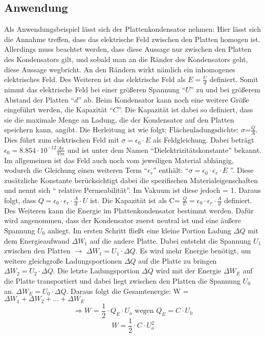 \subsection{Anwendung}
\label{sec:Plattenkondensator}
Als Anwendungsbeispiel lässt sich der Plattenkondensator nehmen:
Hier lässt sich die Annahme treffen, dass das elektrische Feld zwischen den Platten homogen ist.
Allerdings muss beachtet werden, dass diese Aussage nur zwischen den Platten des Kondensators gilt, und sobald man an die Ränder des Kondensators geht, diese Aussage wegbricht.
An den Rändern wirkt nämlich ein inhomogenes elektrisches Feld.
Des Weiteren ist das elektrische Feld als $E = \frac{U}{d}$ definiert.
Somit nimmt das elektrische Feld bei einer größeren Spannung "`$U$"' zu und bei größerem Abstand der Platten "`$d$"' ab.
Beim Kondensator kann noch eine weitere Größe eingeführt werden, die Kapazität "`$C$"'.
Die Kapazität ist dabei so definiert, dass sie die maximale Menge an Ladung, die der Kondensator auf den Platten speichern kann, angibt.
Die Herleitung ist wie folgt:
$\mbox{Flächenladungsdichte: } \sigma \mbox{=} \frac{Q}{A}$.
Dies führt zum elektrischen Feld mit $\sigma = \epsilon_0 \cdot E$ als Feldgleichung.
Dabei beträgt $\epsilon_0 = 8.854 \cdot 10^{-12} \frac{As}{Vm}$ und ist unter dem Namen "`Dielektrizitätskonstante"' bekannt.
Im allgemeinen ist das Feld auch noch vom jeweiligen Material abhängig, wodurch die Gleichung einen weiteren Term "`$\epsilon_r$"' enthält: "`$\sigma = \epsilon_0 \cdot \epsilon_r \cdot E$ "'.
Diese zusätzliche Konstante berücksichtigt dabei die spezifischen Materialeigenschaften und nennt sich "` relative Permeabilität"'.
Im Vakuum ist diese jedoch = 1.
Daraus folgt, dass $ Q = \epsilon_0 \cdot \epsilon_r \cdot \frac{A}{d} \cdot U$ ist.
Die Kapazität ist als $\mbox{C= } \frac{Q}{U} = \epsilon_0 \cdot \epsilon_r \cdot \frac{A}{d}$ definiert.
Des Weiteren kann die Energie im Plattenkondensator bestimmt werden.
Dafür wird angenommen, dass der Kondensator zuerst neutral ist und eine äußere Spannung $U_0$ anliegt.
Im ersten Schritt fließt eine kleine Portion Ladung $\Delta Q$ mit dem Energieaufwand $\Delta W_1$ auf die andere Platte. Dabei entsteht die Spannung $U_1$ zwischen den Platten $\rightarrow$ $\Delta W_1 = U_1 \cdot \Delta Q$.
Es wird mehr Energie benötigt, um  weitere gleichgroße Ladungsportionen $\Delta Q$ auf die Platte zu bringen $\Delta W_2 = U_2 \cdot \Delta Q$.
Die letzte Ladungsportion $\Delta Q$ wird mit der Energie $\Delta W_E$ auf die Platte transportiert und dabei liegt zwischen den Platten die Spannung $U_0$ an. 
$\Delta W_E = U_0 \cdot \Delta Q$.
Daraus folgt die Gesamtenergie: W = $\Delta W_1 + \Delta W_2 +...+ \Delta W_E$
$$\Rightarrow W \mbox{ = } \frac{1}{2}\cdot Q_E \cdot U_o \mbox{ wegen $Q_E = C \cdot U_0$}$$
$$W= \frac{1}{2} \cdot C \cdot U_o^2$$
